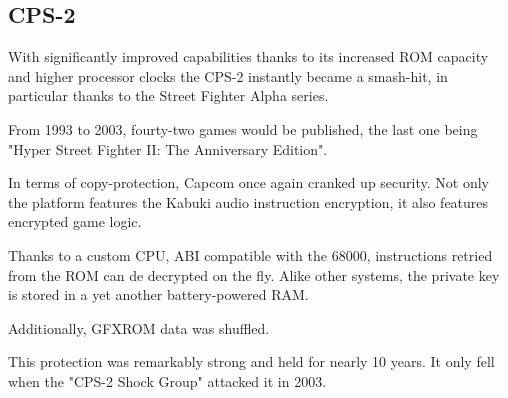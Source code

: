 \subsection{CPS-2}

With significantly improved capabilities thanks to its increased ROM capacity and higher processor clocks the CPS-2 instantly became a smash-hit, in particular thanks to the Street Fighter Alpha series. 

From 1993 to 2003, fourty-two games would be published, the last one being "Hyper Street Fighter II: The Anniversary Edition".

In terms of copy-protection, Capcom once again cranked up security. Not only the platform features the Kabuki audio instruction encryption, it also features encrypted game logic. 

Thanks to a custom CPU, ABI compatible with the 68000, instructions retried from the ROM can de decrypted on the fly. Alike other systems, the private key is stored in a yet another battery-powered RAM.

Additionally, GFXROM data was shuffled.

\begin{trivia}
This protection was remarkably strong and held for nearly 10 years. It only fell when the "CPS-2 Shock Group" attacked it in 2003\cite{cps2rebirth}.
\end{trivia}




